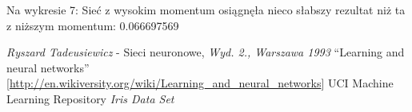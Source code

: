 \documentclass{classrep}
\begin{document}
Na wykresie 7: Sieć z wysokim momentum osiągnęła nieco słabszy rezultat niż ta z niższym momentum: 0.066697569




\begin{thebibliography}{0}
   \textsl{Ryszard Tadeusiewicz} - Sieci neuronowe, \textsl{Wyd. 2., Warszawa 1993}
   ``Learning and neural networks'' [\url{http://en.wikiversity.org/wiki/Learning_and_neural_networks}]
   UCI Machine Learning Repository \textsl{Iris Data Set}
\end{thebibliography}
\end{document}
